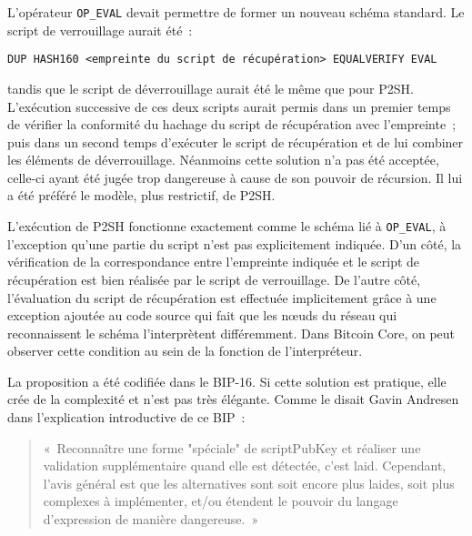 L'opérateur \texttt{OP\_EVAL} devait permettre de former un nouveau schéma standard. Le script de verrouillage aurait été~:

\begin{Verbatim}[fontsize=\footnotesize]
DUP HASH160 <empreinte du script de récupération> EQUALVERIFY EVAL
\end{Verbatim}

tandis que le script de déverrouillage aurait été le même que pour P2SH. L'exécution successive de ces deux scripts aurait permis dans un premier temps de vérifier la conformité du hachage du script de récupération avec l'empreinte~; puis dans un second temps d'exécuter le script de récupération et de lui combiner les éléments de déverrouillage. Néanmoins cette solution n'a pas été acceptée, celle-ci ayant été jugée trop dangereuse à cause de son pouvoir de récursion. Il lui a été préféré le modèle, plus restrictif, de P2SH.

L'exécution de P2SH fonctionne exactement comme le schéma lié à \texttt{OP\_EVAL}, à l'exception qu'une partie du script n'est pas explicitement indiquée. D'un côté, la vérification de la correspondance entre l'empreinte indiquée et le script de récupération est bien réalisée par le script de verrouillage. De l'autre côté, l'évaluation du script de récupération est effectuée implicitement grâce à une exception ajoutée au code source qui fait que les nœuds du réseau qui reconnaissent le schéma l'interprètent différemment. Dans Bitcoin Core, on peut observer cette condition au sein de la fonction  de l'interpréteur.

La proposition a été codifiée dans le BIP-16. Si cette solution est pratique, elle crée de la complexité et n'est pas très élégante. Comme le disait Gavin Andresen dans l'explication introductive de ce BIP~:

\begin{quote}
«~Reconnaître une forme "spéciale" de scriptPubKey et réaliser une validation supplémentaire quand elle est détectée, c'est laid. Cependant, l'avis général est que les alternatives sont soit encore plus laides, soit plus complexes à implémenter, et/ou étendent le pouvoir du langage d'expression de manière dangereuse.~»
\end{quote}

